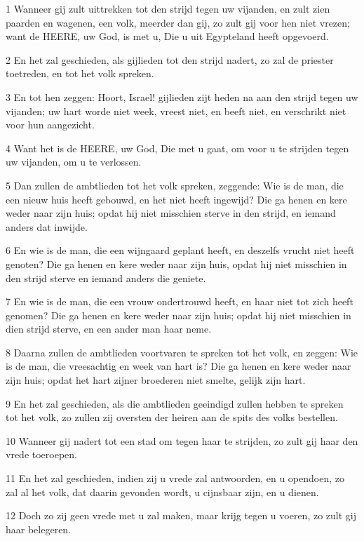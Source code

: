 \par 1 Wanneer gij zult uittrekken tot den strijd tegen uw vijanden, en zult zien paarden en wagenen, een volk, meerder dan gij, zo zult gij voor hen niet vrezen; want de HEERE, uw God, is met u, Die u uit Egypteland heeft opgevoerd.
\par 2 En het zal geschieden, als gijlieden tot den strijd nadert, zo zal de priester toetreden, en tot het volk spreken.
\par 3 En tot hen zeggen: Hoort, Israel! gijlieden zijt heden na aan den strijd tegen uw vijanden; uw hart worde niet week, vreest niet, en beeft niet, en verschrikt niet voor hun aangezicht.
\par 4 Want het is de HEERE, uw God, Die met u gaat, om voor u te strijden tegen uw vijanden, om u te verlossen.
\par 5 Dan zullen de ambtlieden tot het volk spreken, zeggende: Wie is de man, die een nieuw huis heeft gebouwd, en het niet heeft ingewijd? Die ga henen en kere weder naar zijn huis; opdat hij niet misschien sterve in den strijd, en iemand anders dat inwijde.
\par 6 En wie is de man, die een wijngaard geplant heeft, en deszelfs vrucht niet heeft genoten? Die ga henen en kere weder naar zijn huis, opdat hij niet misschien in den strijd sterve en iemand anders die geniete.
\par 7 En wie is de man, die een vrouw ondertrouwd heeft, en haar niet tot zich heeft genomen? Die ga henen en kere weder naar zijn huis; opdat hij niet misschien in dien strijd sterve, en een ander man haar neme.
\par 8 Daarna zullen de ambtlieden voortvaren te spreken tot het volk, en zeggen: Wie is de man, die vreesachtig en week van hart is? Die ga henen en kere weder naar zijn huis; opdat het hart zijner broederen niet smelte, gelijk zijn hart.
\par 9 En het zal geschieden, als die ambtlieden geeindigd zullen hebben te spreken tot het volk, zo zullen zij oversten der heiren aan de spits des volks bestellen.
\par 10 Wanneer gij nadert tot een stad om tegen haar te strijden, zo zult gij haar den vrede toeroepen.
\par 11 En het zal geschieden, indien zij u vrede zal antwoorden, en u opendoen, zo zal al het volk, dat daarin gevonden wordt, u cijnsbaar zijn, en u dienen.
\par 12 Doch zo zij geen vrede met u zal maken, maar krijg tegen u voeren, zo zult gij haar belegeren.
